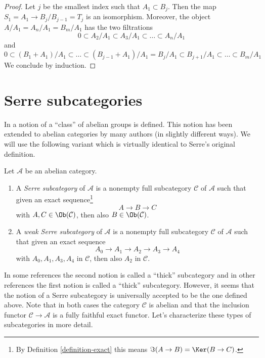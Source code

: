 \begin{proof}
Let $j$ be the smallest index such that $A_1 \subset B_j$.
Then the map $S_1 = A_1 \to B_j/B_{j - 1} = T_j$ is an isomorphism.
Moreover, the object $A/A_1 = A_n/A_1 = B_m/A_1$
has the two filtrations
$$
0 \subset A_2/A_1 \subset A_3/A_1 \subset \ldots \subset A_n/A_1
$$
and
$$
0 \subset (B_1 + A_1)/A_1 \subset \ldots \subset
(B_{j - 1} + A_1)/A_1 = B_j/A_1 \subset B_{j + 1}/A_1
\subset \ldots \subset B_m/A_1
$$
We conclude by induction.
\end{proof}








\section{Serre subcategories}
\label{section-serre-subcategories}

\noindent
In \cite[Chapter I, Section 1]{Serre_homotopie_classes}
a notion of a ``class'' of abelian groups is defined.
This notion has been extended to abelian categories by many authors
(in slightly different ways). We will use the following variant
which is virtually identical to Serre's original definition.

\begin{definition}
\label{definition-serre-subcategory}
\begin{reference}
\cite[Condition (I) on page 259]{Serre_homotopie_classes}
\end{reference}
Let $\mathcal{A}$ be an abelian category.
\begin{enumerate}
\item A {\it Serre subcategory} of $\mathcal{A}$ is a
nonempty full subcategory $\mathcal{C}$ of $\mathcal{A}$
such that given an exact sequence\footnote{By
Definition \ref{definition-exact} this means $\Im(A \to B) = \Ker(B \to C)$.}
$$
A \to B \to C
$$
with $A, C \in \Ob(\mathcal{C})$, then also
$B \in \Ob(\mathcal{C})$.
\item A {\it weak Serre subcategory} of $\mathcal{A}$ is a nonempty
full subcategory $\mathcal{C}$ of $\mathcal{A}$ such that given an
exact sequence
$$
A_0 \to A_1 \to A_2 \to A_3 \to A_4
$$
with $A_0, A_1, A_3, A_4$ in $\mathcal{C}$, then also $A_2$ in $\mathcal{C}$.
\end{enumerate}
\end{definition}

\noindent
In some references the second notion is called a ``thick'' subcategory
and in other references the first notion is called a ``thick'' subcategory.
However, it seems that the notion of a Serre subcategory is universally
accepted to be the one defined above. Note that in both cases the category
$\mathcal{C}$ is abelian and that the inclusion functor
$\mathcal{C} \to \mathcal{A}$ is a fully faithful exact functor.
Let's characterize these types of subcategories in more detail.

